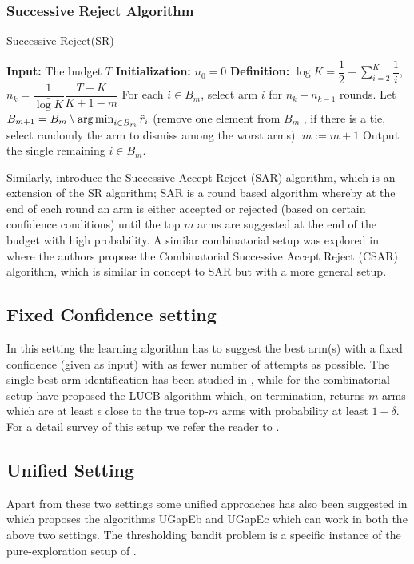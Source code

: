 \subsubsection{Successive Reject Algorithm}


\begin{algorithm}[h!]
\caption{Successive Reject(SR)}
\label{alg:sr}
\begin{algorithmic}[1]
\State \textbf{Input: } The budget $T$
\State \textbf{Initialization: } $n_0 = 0$
\State \textbf{Definition: } $\bar{\log K} = \dfrac{1}{2} + \sum_{i=2}^{K}\dfrac{1}{i}$, $n_k = \dfrac{1}{\bar{\log K}}\dfrac{T-K}{K + 1 - m}$
\State For each $i \in B_{m}$, select arm $i$ for $n_k - n_{k-1}$ rounds.
\State Let $B_{m+1} = B_m\setminus \operatorname*{arg\,min}_{i\in B_m} \hat{r}_i$
(remove one element from $B_m$ , if there
is a tie, select randomly the arm to dismiss among the worst arms).
\State $m:=m+1 $
\EndFor
\State Output the single remaining $i\in B_{m}$.
\end{algorithmic}
\end{algorithm}


Similarly, \citet{bubeck2013multiple} introduce the  Successive Accept Reject (SAR) algorithm, which is an extension of the SR algorithm; SAR is a round based algorithm whereby at the end of each round an arm is either accepted or rejected (based on certain confidence conditions) until the top $m$ arms are suggested at the end of the budget with high probability. A similar combinatorial setup was explored in \citet{chen2014combinatorial} where the authors propose the Combinatorial Successive Accept Reject (CSAR) algorithm, which is similar in concept to SAR but with a more general setup. 

\subsection{Fixed Confidence setting} 

In this setting the learning algorithm has to suggest the best arm(s) with a fixed confidence (given as input) with as fewer number of attempts as possible. The single best arm identification has been studied in \citet{even2006action}, while for the combinatorial setup \citet{kalyanakrishnan2012pac} have proposed the LUCB algorithm which, on termination, returns  $m$ arms which are at least $\epsilon$ close to the true top-$m$ arms with probability at least $1-\delta$. For a detail survey of this setup we refer the reader to \citet{jamieson2014best}. 

\subsection{Unified Setting}
Apart from these two settings some unified approaches has also been suggested in \citet{gabillon2012best} which proposes the algorithms UGapEb and UGapEc which can work in both the above two settings. The thresholding bandit problem is a specific instance of the pure-exploration setup of \citet{chen2014combinatorial}. 



	
	
